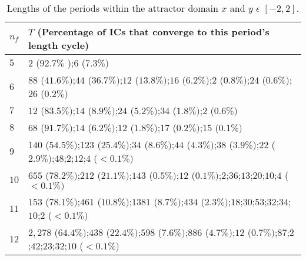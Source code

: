 \begin{table*}[!t]
\renewcommand{\arraystretch}{1.3}
\caption{Lengths of the periods within the attractor domain $x$ and $y$ $\epsilon$  $[-2,2]$.}
\label{tabla}
\centering
\fontsize{9}{9}\selectfont
\begin{tabular}{l  l  }
	\hline
	$n_f$   & $T$ {\scriptsize(Percentage of ICs that converge to this period's length cycle)}                                                                                                                                           \\ \hline\hline
	$5$     & $2$ {\scriptsize($92.7\%$ )};$6$  {\scriptsize($7.3\% )$}                                                                                                                                                                  \\
	$6$     & $88$ {\scriptsize($41.6 \% )$};$44$ {\scriptsize($36.7 \% )$};$12$ {\scriptsize($13.8\% )$};$16$ {\scriptsize($6.2 \% )$};$2$ {\scriptsize($0.8 \% )$};$24$ {\scriptsize($0.6 \% )$};$26$ {\scriptsize($0.2 \%)$}          \\
	$7$     & $12$ {\scriptsize($83.5 \% )$};$14$ {\scriptsize($8.9\% )$};$24$ {\scriptsize($5.2\% )$};$34$ {\scriptsize($1.8 \% )$};$2$ {\scriptsize($0.6\% )$}                                                                         \\
	$8$     & $68$ {\scriptsize($91.7\%)$};$14$ {\scriptsize($6.2\%)$};$12$ {\scriptsize($1.8 \%)$};$17$ {\scriptsize($0.2\% )$};$15$ {\scriptsize($0.1 \%)$}                                                                            \\
	$9$     & $140$ {\scriptsize($54.5 \%)$};$123$ {\scriptsize($25.4 \%)$};$34$ {\scriptsize($8.6\%)$};$44$ {\scriptsize($4.3 \%)$};$38$ {\scriptsize($3.9 \%)$};$22$ {\scriptsize($2.9 \%)$};$48$;$2$;$12$;$4$ {\scriptsize($<0.1\%)$} \\
	$10$    & $655$ {\scriptsize($78.2\%)$};$212$ {\scriptsize($21.1\%)$};$143$ {\scriptsize($0.5\%)$};$12$ {\scriptsize($0.1\%)$};$2$;$36$;$13$;$20$;$10$;$4$ {\scriptsize($<0.1\%)$}                                                   \\
	$11$    & $153$ {\scriptsize($78.1\%)$};$461$ {\scriptsize($10.8\% )$};$1381$ {\scriptsize($8.7\%)$};$434$ {\scriptsize($2.3\%)$};$18$;$30$;$53$;$32$;$34$;$10$;$2$ {\scriptsize($<0.1\% )$}                                         \\
	$12$    & $2,278$ {\scriptsize($64.4\%)$};$438$ {\scriptsize($22.4\% )$};$598$ {\scriptsize($7.6\% )$};$886$ {\scriptsize($4.7 \%)$};$12$ {\scriptsize($0.7\%)$};$87$;$2$;$42$;$23$;$32$;$10$ {\scriptsize($<0.1\% )$}               \\

\end{tabular}
\end{table*}
